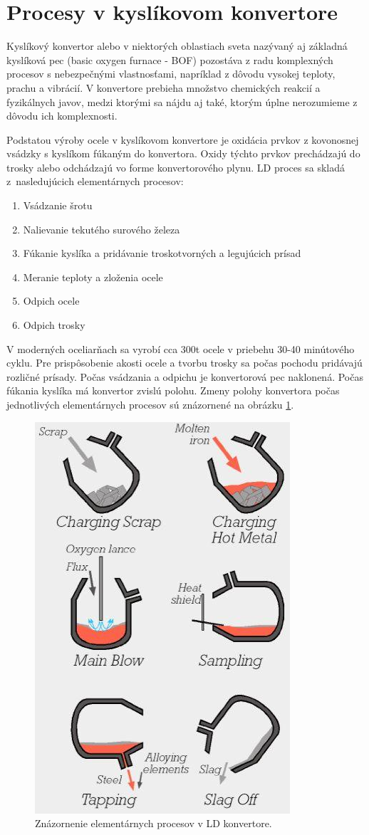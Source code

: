 \documentclass[]{tukediphc}
\begin{document}
\section{Procesy v kyslíkovom konvertore}

Kyslíkový konvertor alebo v niektorých oblastiach sveta nazývaný aj základná kyslíková pec (basic oxygen furnace - BOF) pozostáva z radu komplexných procesov s nebezpečnými vlastnosťami, napríklad z dôvodu vysokej teploty, prachu a vibrácií. V konvertore prebieha  množstvo chemických reakcií a fyzikálnych javov, medzi ktorými sa nájdu aj také, ktorým úplne nerozumieme z dôvodu ich komplexnosti.

Podstatou výroby ocele v kyslíkovom konvertore je oxidácia prvkov z kovonosnej vsádzky s kyslíkom fúkaným do konvertora. Oxidy týchto prvkov prechádzajú do trosky alebo odchádzajú vo forme konvertorového plynu. LD proces sa skladá z~nasledujúcich elementárnych procesov:

\begin{enumerate}
	\item Vsádzanie šrotu
	\item Nalievanie tekutého surového železa
	\item Fúkanie kyslíka a pridávanie troskotvorných a legujúcich prísad
	\item Meranie teploty a zloženia ocele
	\item Odpich ocele
	\item Odpich trosky
\end{enumerate}

V moderných oceliarňach sa vyrobí cca 300t ocele v priebehu 30-40 minútového cyklu. Pre prispôsobenie akosti ocele a tvorbu trosky sa počas pochodu pridávajú rozličné prísady. Počas vsádzania a odpichu je konvertorová pec naklonená. Počas fúkania kyslíka má konvertor zvislú polohu. Zmeny polohy konvertora počas jednotlivých elementárnych procesov sú znázornené na obrázku \ref{o:30}.

\begin{figure}[h!]
	\centering
	\includegraphics[width=.35\textwidth,angle=0]{convertor-phases.jpg}
	\caption{Znázornenie elementárnych procesov v LD konvertore.}
	\label{o:30}
\end{figure}
\end{document}
